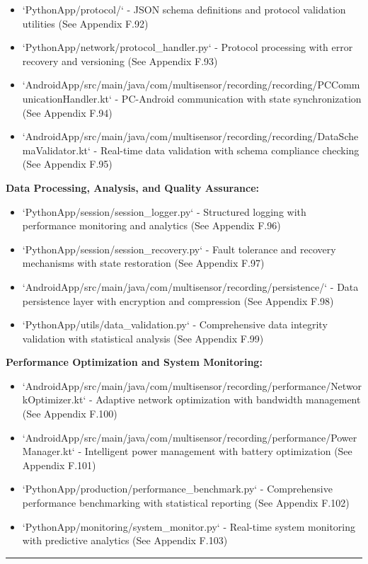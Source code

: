 \documentclass[12pt,a4paper]{report}
\begin{document}
\begin{itemize}
\item `PythonApp/protocol/` - JSON schema definitions and protocol validation utilities (See Appendix F.92)
\item `PythonApp/network/protocol_handler.py` - Protocol processing with error recovery and versioning (See Appendix
  F.93)
\item `AndroidApp/src/main/java/com/multisensor/recording/recording/PCCommunicationHandler.kt` - PC-Android communication
  with state synchronization (See Appendix F.94)
\item `AndroidApp/src/main/java/com/multisensor/recording/recording/DataSchemaValidator.kt` - Real-time data validation with
  schema compliance checking (See Appendix F.95)

\end{itemize}
\textbf{Data Processing, Analysis, and Quality Assurance:}

\begin{itemize}
\item `PythonApp/session/session_logger.py` - Structured logging with performance monitoring and analytics (See Appendix
  F.96)
\item `PythonApp/session/session_recovery.py` - Fault tolerance and recovery mechanisms with state restoration (See
  Appendix F.97)
\item `AndroidApp/src/main/java/com/multisensor/recording/persistence/` - Data persistence layer with encryption and
  compression (See Appendix F.98)
\item `PythonApp/utils/data_validation.py` - Comprehensive data integrity validation with statistical analysis (See
  Appendix F.99)

\end{itemize}
\textbf{Performance Optimization and System Monitoring:}

\begin{itemize}
\item `AndroidApp/src/main/java/com/multisensor/recording/performance/NetworkOptimizer.kt` - Adaptive network optimization
  with bandwidth management (See Appendix F.100)
\item `AndroidApp/src/main/java/com/multisensor/recording/performance/PowerManager.kt` - Intelligent power management with
  battery optimization (See Appendix F.101)
\item `PythonApp/production/performance_benchmark.py` - Comprehensive performance benchmarking with statistical
  reporting (See Appendix F.102)
\item `PythonApp/monitoring/system_monitor.py` - Real-time system monitoring with predictive analytics (See Appendix
  F.103)

\end{itemize}
\hrule
\end{document}
